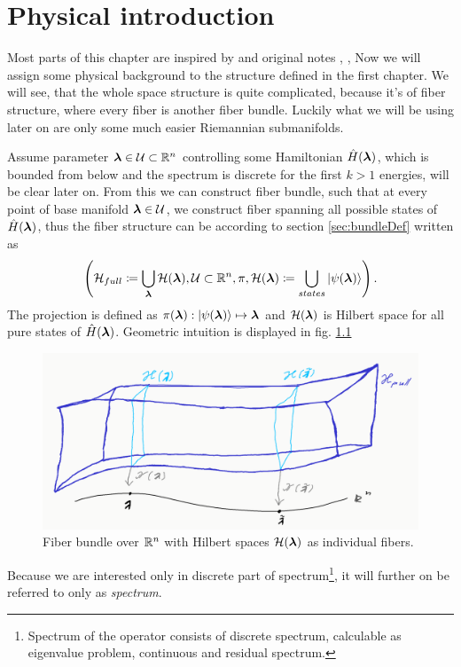 \chapter{Physical introduction}
\label{chap:physicalIntro}

Most parts of this chapter are inspired by \citep{kolodrubez} and original notes \citep{berry1984}, \citep{berry1989}, \citep{berry2009}
Now we will assign some physical background to the structure defined in the first chapter. We will see, that the whole space structure is quite complicated, because it's of fiber structure, where every fiber is another fiber bundle. Luckily what we will be using later on are only some much easier Riemannian submanifolds. 


Assume parameter ${\bm\lambda}\in\mathcal{U}\subset\mathbb{R}^n$ controlling some Hamiltonian $\hat{H}({\bm\lambda})$, which is bounded from below and the spectrum is discrete for the first $k>1$ energies, will be clear later on. From this we can construct fiber bundle, such that at every point of base manifold ${\bm\lambda}\in \mathcal{U}$, we construct fiber spanning all possible states of $\hat{H}({\bm\lambda})$, thus the fiber structure can be according to section \ref{sec:bundleDef} written as
$$\left(\mathcal{H}_{full}\coloneqq \bigcup_{\bm\lambda} \mathcal{H}({\bm\lambda}),\mathcal{U}\subset \mathbb{R}^n,\pi, \mathcal{H}({\bm\lambda}) \coloneqq \bigcup_{states}\ket{\psi({\bm\lambda})}  \right).$$
The projection is defined as $\pi({\bm\lambda}): \ket{\psi({\bm\lambda})}\mapsto {\bm\lambda}$ and $\mathcal{H}({\bm\lambda})$ is Hilbert space for all pure states of $\hat{H}({\bm\lambda})$. 
Geometric intuition is displayed in fig. \ref{fig:wholeBundle}
\begin{figure}[h]
    \centering
    \includegraphics[width=\textwidth]{../img/manifold_basic.png}
\caption{Fiber bundle over $\mathbb{R}^n$ with Hilbert spaces $\mathcal{H}({\bm\lambda})$ as individual fibers.}
    \label{fig:wholeBundle}
\end{figure}


Because we are interested only in discrete part of spectrum\footnote{Spectrum of the operator consists of discrete spectrum, calculable as eigenvalue problem, continuous and residual spectrum.}, it will further on be referred to only as \emph{spectrum}. 

